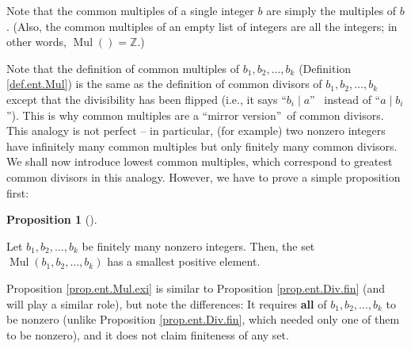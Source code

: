 \documentclass[numbers=enddot,12pt,final,onecolumn,notitlepage]{scrartcl}%
\numberwithin{exer}{subsection}
\theoremstyle{definition}
\newtheorem{prop}[theo]{Proposition}
\newenvironment{proposition}[1][]
{\begin{prop}[#1]\begin{leftbar}}
{\end{leftbar}\end{prop}}
\begin{document}
Note that the common multiples of a single integer $b$ are simply the
multiples of $b$. (Also, the common multiples of an empty list of integers are
all the integers; in other words, $\operatorname*{Mul}\left(  {}\right)
=\mathbb{Z}$.)

Note that the definition of common multiples of $b_{1},b_{2},\ldots,b_{k}$
(Definition \ref{def.ent.Mul}) is the same as the definition of common
divisors of $b_{1},b_{2},\ldots,b_{k}$ except that the divisibility has been
flipped (i.e., it says \textquotedblleft$b_{i}\mid a$\textquotedblright%
\ instead of \textquotedblleft$a\mid b_{i}$\textquotedblright). This is why
common multiples are a \textquotedblleft mirror version\textquotedblright\ of
common divisors. This analogy is not perfect -- in particular, (for example)
two nonzero integers have infinitely many common multiples but only finitely
many common divisors. We shall now introduce lowest common multiples, which
correspond to greatest common divisors in this analogy. However, we have to
prove a simple proposition first:

\begin{proposition}
\label{prop.ent.Mul.exi}Let $b_{1},b_{2},\ldots,b_{k}$ be finitely many
nonzero integers. Then, the set $\operatorname*{Mul}\left(  b_{1},b_{2}%
,\ldots,b_{k}\right)  $ has a smallest positive element.
\end{proposition}

Proposition \ref{prop.ent.Mul.exi} is similar to Proposition
\ref{prop.ent.Div.fin} (and will play a similar role), but note the
differences: It requires \textbf{all} of $b_{1},b_{2},\ldots,b_{k}$ to be
nonzero (unlike Proposition \ref{prop.ent.Div.fin}, which needed only one of
them to be nonzero), and it does not claim finiteness of any set.
\end{document}
